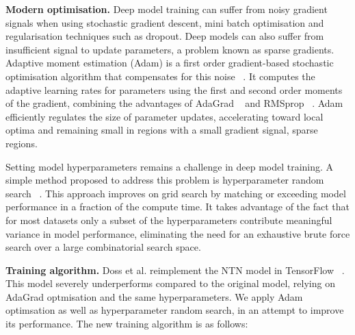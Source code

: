 \noindent \textbf{Modern optimisation.} Deep model training can suffer from noisy gradient signals when using stochastic gradient descent, mini batch optimisation and regularisation techniques such as dropout. Deep models can also suffer from insufficient signal to update parameters, a problem known as sparse gradients. Adaptive moment estimation (Adam) is a first order gradient-based stochastic optimisation algorithm that compensates for this noise \unskip ~\citep{kingma2014adam}. It computes the adaptive learning rates for parameters using the first and second order moments of the gradient, combining the advantages of AdaGrad ~\citep{duchi2011adaptive} and RMSprop ~\citep{tieleman2012lecture}. Adam efficiently regulates the size of parameter updates, accelerating toward local optima and remaining small in regions with a small gradient signal, sparse regions. \par

\noindent Setting model hyperparameters remains a challenge in deep model training. A simple method proposed to address this problem is hyperparameter random search \unskip ~\citep{bergstra2012random}. This approach improves on grid search by matching or exceeding model performance in a fraction of the compute time. It takes advantage of the fact that for most datasets only a subset of the hyperparameters contribute meaningful variance in model performance, eliminating the need for an exhaustive brute force search over a large combinatorial search space. \par

\noindent \textbf{Training algorithm.} Doss et al. reimplement the NTN model in TensorFlow \unskip ~\citep{abadi2016tensorflow}. This model severely underperforms compared to the original model, relying on AdaGrad optmisation and the same hyperparameters. We apply Adam optimsation as well as hyperparameter random search, in an attempt to improve its performance. The new training algorithm is as follows: 

\medskip

